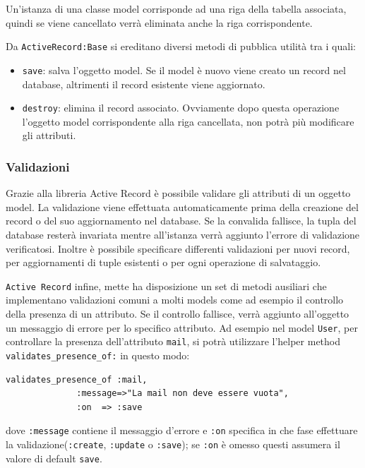 \documentclass[11pt,a4paper]{article}
\begin{document}
Un'istanza di una classe model corrisponde ad una riga della tabella associata, quindi se viene cancellato verrà eliminata anche la riga corrispondente.

Da \verb|ActiveRecord:Base| si ereditano diversi metodi di pubblica utilità tra i quali:
\begin{itemize}
 \item \verb|save|: salva l'oggetto model. Se il model è nuovo viene creato un record nel database, altrimenti il record esistente viene aggiornato.
 \item \verb|destroy|: elimina il record associato. Ovviamente dopo questa operazione l'oggetto model corrispondente alla riga cancellata, non potrà più modificare gli attributi.
\end{itemize}
\subsubsection*{Validazioni}
Grazie alla libreria Active Record è possibile validare gli attributi di un oggetto model. La validazione viene effettuata automaticamente prima della creazione del record o del suo aggiornamento nel database. Se la convalida fallisce, la tupla del database resterà invariata mentre all'istanza verrà aggiunto l'errore di validazione verificatosi. Inoltre è possibile specificare differenti validazioni per nuovi record, per aggiornamenti di tuple esistenti o per ogni operazione di salvataggio.

\verb|Active Record| infine, mette ha disposizione un set di metodi ausiliari che implementano validazioni comuni a molti models come ad esempio il controllo della presenza di un attributo. Se il controllo fallisce, verrà aggiunto all'oggetto un messaggio di errore per lo specifico attributo.
Ad esempio nel model \verb|User|, per controllare la presenza dell'attributo \verb|mail|, si potrà utilizzare l'helper method \verb|validates_presence_of:| in questo modo:\\
\begin{verbatim}
validates_presence_of :mail,
		      :message=>"La mail non deve essere vuota",
		      :on  => :save
\end{verbatim}
dove \verb|:message| contiene il messaggio d'errore e \verb|:on| specifica in che fase effettuare la validazione(\verb|:create|, \verb|:update| o \verb|:save|); se \verb|:on| è omesso questi assumera il valore di default \verb|save|.
\end{document}
